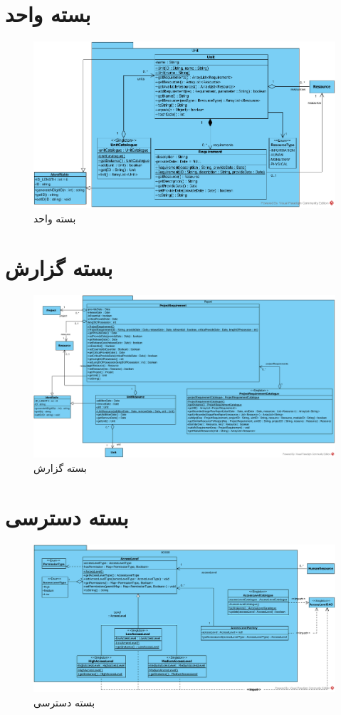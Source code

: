 \begin{landscape}
\section{بسته واحد}
\begin{figure}[H]
	\centering
	\includegraphics[scale=0.6]{img/class-design/UnitPackage}
	\caption{بسته واحد}
\end{figure}

\section{بسته گزارش}
\begin{figure}[H]
	\centering
	\includegraphics[scale=0.45]{img/class-design/ReportPackage}
	\caption{بسته گزارش}
\end{figure}

\section{بسته دسترسی}
\begin{figure}[H]
	\centering
	\includegraphics[scale=0.6]{img/class-design/AccessPackage}
	\caption{بسته دسترسی}
\end{figure}


\end{landscape}
